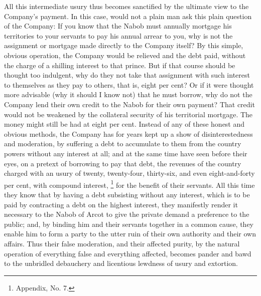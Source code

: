 All this intermediate usury thus becomes sanctified by the ultimate view to the Company's payment. In this case, would not a plain man ask this plain question of the Company: If you know that the Nabob must annually mortgage his territories to your servants to pay his annual arrear to you, why is not the assignment or mortgage made directly to the Company itself? By this simple, obvious operation, the Company would be relieved and the debt paid, without the charge of a shilling interest to that prince. But if that course should be thought too indulgent, why do they not take that assignment with such interest to themselves as they pay to others, that is, eight per cent? Or if it were thought more advisable (why it should I know not) that he must borrow, why do not the Company lend their own credit to the Nabob for their own payment? That credit would not be weakened by the collateral security of his territorial mortgage. The money might still be had at eight per cent. Instead of any of these honest and obvious methods, the Company has for years kept up a show of disinterestedness and moderation, by suffering a debt to accumulate to them from the country powers without any interest at all; and at the same time have seen before their eyes, on a pretext of borrowing to pay that debt, the revenues of the country charged with an usury of twenty, twenty-four, thirty-six, and even eight-and-forty per cent, with compound interest,
\footnote{ Appendix, No. 7.}
 for the benefit of their servants. All this time they know that by having a debt subsisting without any interest, which is to be paid by contracting a debt on the highest interest, they manifestly render it necessary to the Nabob of Arcot to give the private demand a preference to the public; and, by binding him and their servants together in a common cause, they enable him to form a party to the utter ruin of their own authority and their own affairs. Thus their false moderation, and their affected purity, by the natural operation of everything false and everything affected, becomes pander and bawd to the unbridled debauchery and licentious lewdness of usury and extortion.

